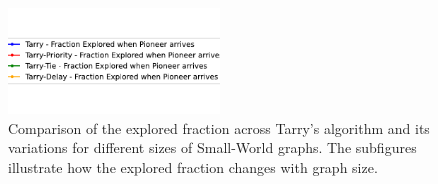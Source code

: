 \begin{figure}[H]
    \centering
    \qquad
    \qquad
    \includegraphics[width=0.5\textwidth]{Cap3/tarry_var_fraction_legend.pdf}
    \newline 
    \qquad
    \newline 
    \qquad
    \caption{Comparison of the explored fraction across Tarry's algorithm and its variations for different sizes of Small-World graphs. The subfigures illustrate how the explored fraction changes with graph size.} 
    \label{fig_tarry_fraction_all_sizes_sw} 
\end{figure}

